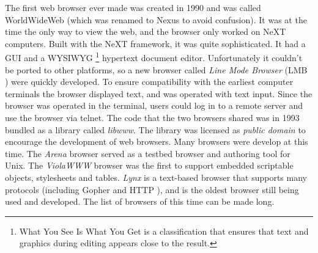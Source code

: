 \documentclass[a4paper,11pt]{kth-mag}
\newcommand\abbr[2][]{\uppercase{#2}\ifthenelse{\equal{#1}{}}%
                     {}{#1}}
\begin{document}
        The first web browser ever made was created in 1990 and was called WorldWideWeb (which was renamed to Nexus to avoid confusion).
        It was at the time the only way to view the web, and the browser only worked on NeXT computers.
        Built with the NeXT framework, it was quite sophisticated.
        It had a \abbr{gui} and a \abbr{wysiwyg}\footnote{What You See Is What You Get is a classification that ensures that text and graphics during editing appears close to the result.} hypertext document editor.
        Unfortunately it couldn't be ported to other platforms, so a new browser called \emph{Line Mode Browser} (\abbr{lmb}) were quickly developed.
        To ensure compatibility with the earliest computer terminals the browser displayed text, and was operated with text input.
        Since the browser was operated in the terminal, users could log in to a remote server and use the browser via telnet.
        The code that the two browsers shared was in 1993 bundled as a library called \emph{libwww}.
        The library was licensed as \emph{public domain} to encourage the development of web browsers.
        Many browsers were develop at this time.
        The \emph{Arena} browser served as a testbed browser and authoring tool for Unix.
        The \emph{ViolaWWW} browser was the first to support embedded scriptable objects, stylesheets and tables.
        \emph{Lynx} is a text-based browser that supports many protocols (including Gopher and \abbr{http}), and is the oldest browser still being used and developed.
        The list of browsers of this time can be made long.
\end{document}
